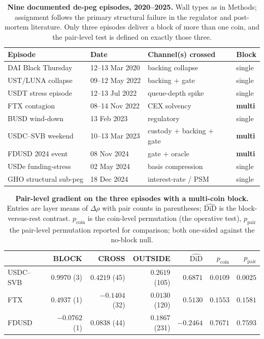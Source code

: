 \documentclass[12pt]{article}
\begin{document}
\begin{table}[!ht]
\centering
\caption{\textbf{Nine documented de-peg episodes, 2020--2025.} Wall types as in Methods; assignment follows the primary structural failure in the regulator and post-mortem literature. Only three episodes deliver a block of more than one coin, and the pair-level test is defined on exactly those three.}
\label{tab:events}
\small
\begin{tabular}{@{}llll@{}}
\toprule
Episode & Date & Channel(s) crossed & Block \\
\midrule
DAI Black Thursday        & 12--13 Mar 2020 & backing collapse                          & single \\
UST/LUNA collapse         & 09--12 May 2022 & backing $+$ gate                          & single \\
USDT stress episode       & 12--13 Jul 2022 & queue-depth spike                         & single \\
FTX contagion             & 08--14 Nov 2022 & CEX solvency                              & \textbf{multi} \\
BUSD wind-down            & 13 Feb 2023     & regulatory                                & single \\
USDC--SVB weekend         & 10--13 Mar 2023 & custody $+$ backing $+$ gate              & \textbf{multi} \\
FDUSD 2024 event          & 08 Nov 2024     & gate $+$ oracle                           & \textbf{multi} \\
USDe funding-stress       & 02 May 2024     & basis compression                         & single \\
GHO structural sub-peg    & 18 Dec 2024     & interest-rate / PSM                       & single \\
\bottomrule
\end{tabular}
\end{table}

\begin{table}[!ht]
\centering
\caption{\textbf{Pair-level gradient on the three episodes with a multi-coin block.} Entries are layer means of $\Delta\rho$ with pair counts in parentheses; $\widehat{\mathrm{DiD}}$ is the block-versus-rest contrast. $p_{\mathrm{coin}}$ is the coin-level permutation (the operative test), $p_{\mathrm{pair}}$ the pair-level permutation reported for comparison; both one-sided against the no-block null.}
\label{tab:gradient}
\begin{tabular}{@{}lrrrrrr@{}}
\toprule
& BLOCK & CROSS & OUTSIDE & $\widehat{\mathrm{DiD}}$ & $p_{\mathrm{coin}}$ & $p_{\mathrm{pair}}$ \\
\midrule
USDC--SVB & $0.9970$ (3) & $0.4219$ (45) & $0.2619$ (105) & $0.6871$ & $0.0109$ & $0.0025$ \\
FTX       & $0.4937$ (1) & $-0.1404$ (32) & $0.0130$ (120) & $0.5130$ & $0.1553$ & $0.1581$ \\
FDUSD     & $-0.0762$ (1) & $0.0838$ (44) & $0.1867$ (231) & $-0.2464$ & $0.7671$ & $0.7593$ \\
\bottomrule
\end{tabular}
\end{table}
\end{document}
